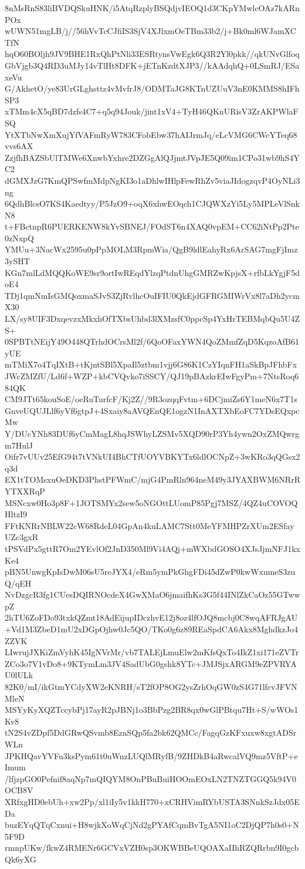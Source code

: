 8nMsRnS83liBVDQSkuHNK/i5AtqRzplyBSQdjvIEOQ1d3CKpYMwlcOAz7kARnPOx
wUWN51mgLB/j//56hVvTcCJfiIS3SjV4XJlxmOeTBm33b2/j+Bk0ml6WJamXCTfN
hqO60BOljh9JV9BHE1RxQhPtNli33ESRtynsVwEgk6Q3R2Yl0pkk//qkUNvGlfoq
GbVjgb3Q4RD3uMJy14vTlHt8DFK+jETnKzdtXJP3//kAAdqhQ+0LSmRJ/ESaxeVu
G/AkhetO/ye83UrGLghsttz4vMvfrJ8/ODMTaJG8KTnUZUuV3nE0KMMS8hIFhSP3
xTMm4cX5qBD7dzfs4C7+q5q94Jouk/jint1xV4+TyH46QKnURisV3ZrAKPWlaFSQ
YtXTbNwXmXujYfVAFmRyW783CFobEbw37hAIJrmJq/eLcVMG6CWcYTeq68vvs6AX
ZzjfhBAZSbUlTMWe6XnwbYxhre2DZGgAlQJjmtJVpJE5Q09im1CPo31wb9hS4YC2
dGMXJzG7KmQPSwfmMdpNgKI3o1aDhlwIHlpFewRhZv5viaJIdogzqvP4OyNLi3ng
6QdhBlcsO7KS4Kaedtyy/P5JzO9+oqX6xhwEOqch1CJQWXzYi5Ly5MPLeVlSnkN8
t+FBctnpR6PUERKENW8kYvSBNEJ/FOdST6n4XAQ0vpEM+CC62iNtPp2Pte0zNxpQ
YMUu+3NacWx2595u0pPpMOLM3RpmWia/QgB9ldlEahyRx6ArSAG7mgFjImz3ySHT
KGn7mlLdMQQKoWE9sr9ortIwREqdYlzqPtdnUhgGMRZwKpjsX+rfbLkYgjF5doE4
TDj1qmNmIsGMQoxmaSJvS3ZjRvlhcOuIFIU0QkEjdGFRGMIWrVx8l7aDh2ycmX30
LX/sy8UIF3DxqevzxMkxhOfTXbsUhbd3lXMzsfC0ppcSp4YxHrTEBMqbQu5U4ZS+
0SPBTtNEijY49O448QTrhdOCrsMl2f/6QoOFaxYWN4QoZMmfZqD5KqzoAfB61yUE
mTMiX7o4TqIXtB+tKjntSBl5XpaIl5ztbm1vjj6G86K1CzYIqnFH1aSkBpJFhbFx
JWcZMZfU/Ld6f+WZP+kbCVQvko7iSSCY/QJ19pBAzkrEIwFgyPm+7NtsRoq684QK
CM9JTt65kouSoE/oeRuTurfcF/Kj2Z//9R3ozqqFvtm+6DCjmiZs6Y1meN6x7T1s
GnveUQUJLlf6yVf6gtpJ+4Sxaiy8aAVQEnQE1ogzN1InAXTXbEoFC7YDsEQxpcMw
Y/DUcYNh83DUf6yCmMagL8hqJSWhyLZSMv5XQD90rP3Yh4ywn2OxZMQwrgm7HulJ
Oifr7vUUv25EfG94t7tVNkUI4BhCTfUOYVBKYTx6ldlOCNpZ+3wKRo3qQGsx2q3d
EX1tTOMsxuOeDKD3PhstPFWmC/mjG4PmRln964neM49y3JYAXBWM6NRrRYTXXRqP
MSNcxw0Ho3p8F+1JOTSMYx2sew5oNGOttLUomP85Pgj7MSZ/4QZ4uCOVOQHltzI9
FFtKNRrNBLW22cW68RdeL04GpAn4kuLAMC7Stt0MeYFMHPZrXUm2ESfayUZc3gxR
tPSVdPx5gttR7Om2YEvlOf2JnD350Ml9Vi4AQj+mWXbdGOSO4XJsJjmNFJ1kxKe4
pBN5UnwgKpIsDwM06sU5reJYX4/eRm5ymPkGhgFDi45dZwP0kwWxumeS3zuQ/qEH
NvDzgcR3fg1CUesDQIRNOcdeX4GwXMaO6jmaifhKs3G5f44INlZkCaOz55GTwwpZ
2hTU6ZoFDo93txkQZmt18AdEijupIDczhvE12j8oz4lfOJQ8mcbj0C8wqAFRJgAU
+Vd1M3ZbeD1mU2xDGpOjhw0Jc5QO/TKo0g6z89REaSpdCA6Akx8MghdkzJo4ZZVK
LIwrujJXKiZmVyhK45IgNVrMr/vb7TALEjLmuElw2mKfsQxTo4IkZ1xi171eZVTr
ZCo3o7V1vDo8+9KTymLm3JV4SadUbG0gshk8YTc+JMJSjxARGM9eZPVRYAU0lULk
82K0/mI/ikGtmYCdyXW2eKNRH/sT2fOP8OG2ysZrhOqGW0zS4G71lfcvJFVNMleN
MSYyKyXQZTccybPj17ayR2pJBNj1o3BbPzg2BR8qx0wGlPBtqu7Ht+S/wWOs1Kv8
tN2S4vZDpf5DdGRwQSvmb8EznSQp5fa2bk62QMCc/FagqGzKFxuxw8xgtADSrWLn
JPKHQavYVFu3ksPym61t0uWnzLUQlMRyfB/9ZHDkB4aRwcalVQ9mz5VftP+eImum
/lfjzpGO0Pefnif8aqNp7mQIQYM8OnPBuBuiHOOmEOxLN2TNZTGGQ5k94V0OCB8V
XRfxgHD0ebUh+xw2Pp/xl1iIy5v1kkH770+xCRHVimRYbUSTA3SNnkSzJdx05EDa
buzEYqQTqCxnui+H8wjkXoWqCjNd2gPYAfCqmBvTgA5NI1oC2DjQP7h0s0+N5F9D
rmnpUKw/fkwZ4RMENr6GCVxVZH0sp3OKWBBeUQOAXaIIhRZQRrbn9I0gcbQk6yXG
